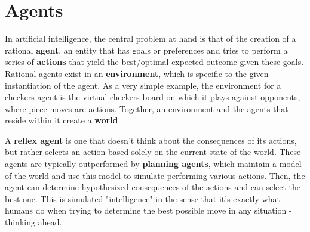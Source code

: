 \documentclass[11pt,fleqn]{article}
\def\title{Note \the\lecturenumber}
\begin{document}
\maketitle

\section*{Agents}

In artificial intelligence, the central problem at hand is that of the creation of a rational \textbf{agent}, an entity that has goals or preferences and tries to perform a series of \textbf{actions} that yield the best/optimal expected outcome given these goals. Rational agents exist in an \textbf{environment}, which is specific to the given instantiation of the agent. As a very simple example, the environment for a checkers agent is the virtual checkers board on which it plays against opponents, where piece moves are actions. Together, an environment and the agents that reside within it create a \textbf{world}. 

A \textbf{reflex agent} is one that doesn't think about the consequences of its actions, but rather selects an action based solely on the current state of the world. These agents are typically outperformed by \textbf{planning agents}, which maintain a model of the world and use this model to simulate performing various actions. Then, the agent can determine hypothesized consequences of the actions and can select the best one. This is simulated "intelligence" in the sense that it's exactly what humans do when trying to determine the best possible move in any situation - thinking ahead.


\end{document}
\end{document}
